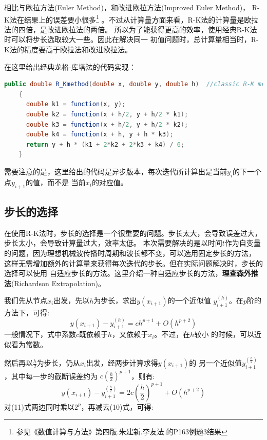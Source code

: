 \documentclass[lang=cn,a4paper,newtx]{elegantpaper}
\begin{document}
  相比与欧拉方法(Euler Method)，和改进欧拉方法(Improved Euler Method)，
  R-K法在结果上的误差要小很多\footnote[1]{参见《数值计算与方法》第四版.朱建新.李友法.的P163例题3结果}
  。不过从计算量方面来看，R-K法的计算量是欧拉法的四倍，是改进欧拉法的两倍。
  所以为了能获得更高的效率，使用经典R-K法时可以将步长选取较大一些。因此在解决同一
  初值问题时，总计算量相当时，R-K法的精度要高于欧拉法和改进欧拉法。

  在这里给出经典龙格-库塔法的代码实现：
  \begin{lstlisting}[language=java]
    public double R_Kmethod(double x, double y, double h)  //classic R-K method
    {
      double k1 = function(x, y);
      double k2 = function(x + h/2, y + h/2 * k1);
      double k3 = function(x + h/2, y + h/2 * k2);
      double k4 = function(x + h, y + h * k3);
      return y + h * (k1 + 2*k2 + 2*k3 + k4) / 6;
    }
  \end{lstlisting}
  需要注意的是，这里给出的代码是异步版本，每次迭代所计算出是当前$y_i$的下一个点$y_{i+1}$的值，而不是
  当前$x_i$的对应值。
  
  \subsection{步长的选择}
  在使用R-K法时，步长的选择是一个很重要的问题。步长太大，会导致误差过大，步长太小，会导致计算量过大，效率太低。
  本次需要解决的是以时间$t$作为自变量的问题，因为理想机械波传播时周期和波长都不变，可以选用固定步长的方法，
  这样无需增加额外的计算量来获得每次迭代的步长。但在实际问题解决时，步长的选择可以使用
  自适应步长的方法。这里介绍一种自适应步长的方法，\textbf{理查森外推法}(Richardson Extrapolation)。

  我们先从节点$x_i$出发，先以$h$为步长，求出$y(x_{i+1})$的一个近似值
  $y_{i+1}^{(h)}$。在$p$阶的方法下，可得:
  \begin{equation}
    y(x_{i+1})-y_{i+1}^{(h)}=ch^{p+1}+O(h^{p+2})
  \end{equation}
  一般情况下，式中系数$c$既依赖于$h$，又依赖于$x_i$。不过，在$h$较小
  的时候，可以近似看为常数。

  然后再以$\frac{h}{2}$为步长，仍从$x_i$出发，经两步计算求得$y(x_{i+1})$的
  另一个近似值$y_{i+1}^{(\frac{h}{2})}$，其中每一步的截断误差约为
  $c(\frac{h}{2})^{p+1}$，则有:
  \begin{equation}
    y(x_{i+1})-y_{i+1}^{(\frac{h}{2})}=2c(\frac{h}{2})^{p+1}+O(h^{p+2})
  \end{equation}
  对(11)式两边同时乘以$2^p$，再减去(10)式，可得:
\end{document}
